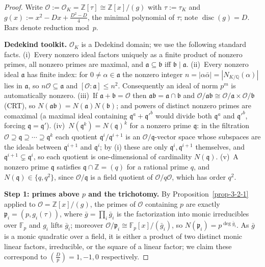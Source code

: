 \begin{proof}
  Write $\mathcal{O} := \mathcal{O}_K = \mathbb{Z}[\tau] \cong \mathbb{Z}[x]/(g)$ with
  $\tau := \tau_K$ and $g(x) := x^2 - Dx + \tfrac{D^2-D}{4}$, the minimal polynomial of
  $\tau$; note $\operatorname{disc}(g) = D$. Bars denote reduction mod~$p$.

  \textbf{Dedekind toolkit.} $\mathcal{O}_K$ is a Dedekind domain; we use the following
  standard facts.
  (i)~Every nonzero ideal factors uniquely as a finite product of nonzero primes, all
  nonzero primes are maximal, and $\mathfrak{a} \subseteq \mathfrak{b}$ iff
  $\mathfrak{b} \mid \mathfrak{a}$.
  (ii)~Every nonzero ideal $\mathfrak{a}$ has finite index: for
  $0 \neq \alpha \in \mathfrak{a}$ the nonzero integer
  $n = |\alpha\bar{\alpha}| = |N_{K/\mathbb{Q}}(\alpha)|$ lies in $\mathfrak{a}$, so
  $n\mathcal{O} \subseteq \mathfrak{a}$ and
  $[\mathcal{O} : \mathfrak{a}] \le n^2$. Consequently an ideal of norm $p^m$ is
  automatically nonzero.
  (iii)~If $\mathfrak{a} + \mathfrak{b} = \mathcal{O}$ then
  $\mathfrak{a}\mathfrak{b} = \mathfrak{a} \cap \mathfrak{b}$ and
  $\mathcal{O}/\mathfrak{a}\mathfrak{b} \cong \mathcal{O}/\mathfrak{a} \times
  \mathcal{O}/\mathfrak{b}$ (CRT), so $N(\mathfrak{a}\mathfrak{b}) =
  N(\mathfrak{a})N(\mathfrak{b})$; and powers of distinct nonzero primes are comaximal (a
  maximal ideal containing $\mathfrak{q}^a + \mathfrak{q}'^b$ would divide both
  $\mathfrak{q}^a$ and $\mathfrak{q}'^b$, forcing $\mathfrak{q} = \mathfrak{q}'$).
  (iv)~$N(\mathfrak{q}^k) = N(\mathfrak{q})^k$ for a nonzero prime $\mathfrak{q}$: in the
  filtration $\mathcal{O} \supseteq \mathfrak{q} \supseteq \cdots \supseteq \mathfrak{q}^k$
  each quotient $\mathfrak{q}^i/\mathfrak{q}^{i+1}$ is an
  $\mathcal{O}/\mathfrak{q}$-vector space whose subspaces are the ideals between
  $\mathfrak{q}^{i+1}$ and $\mathfrak{q}^i$; by (i) these are only
  $\mathfrak{q}^i, \mathfrak{q}^{i+1}$ themselves, and
  $\mathfrak{q}^{i+1} \subsetneq \mathfrak{q}^i$, so each quotient is one-dimensional of
  cardinality $N(\mathfrak{q})$.
  (v)~A nonzero prime $\mathfrak{q}$ satisfies $\mathfrak{q} \cap \mathbb{Z} = (q)$ for a
  rational prime $q$, and $N(\mathfrak{q}) \in \{q, q^2\}$, since
  $\mathcal{O}/\mathfrak{q}$ is a field quotient of $\mathcal{O}/q\mathcal{O}$, which has
  order $q^2$.

  \textbf{Step 1: primes above $p$ and the trichotomy.} By
  Proposition~\ref{prop-3-2-1} applied to $\mathcal{O} = \mathbb{Z}[x]/(g)$, the primes of
  $\mathcal{O}$ containing $p$ are exactly $\mathfrak{p}_i = (p, g_i(\tau))$, where
  $\bar{g} = \prod_i \bar{g}_i$ is the factorization into monic irreducibles over
  $\mathbb{F}_p$ and $g_i$ lifts $\bar{g}_i$; moreover
  $\mathcal{O}/\mathfrak{p}_i \cong \mathbb{F}_p[x]/(\bar{g}_i)$, so
  $N(\mathfrak{p}_i) = p^{\deg \bar{g}_i}$. As $\bar{g}$ is a monic quadratic over a
  field, it is either a product of two distinct monic linear factors, irreducible, or the
  square of a linear factor; we claim these correspond to
  $\left(\frac{D}{p}\right) = 1, -1, 0$ respectively.


\end{proof}
